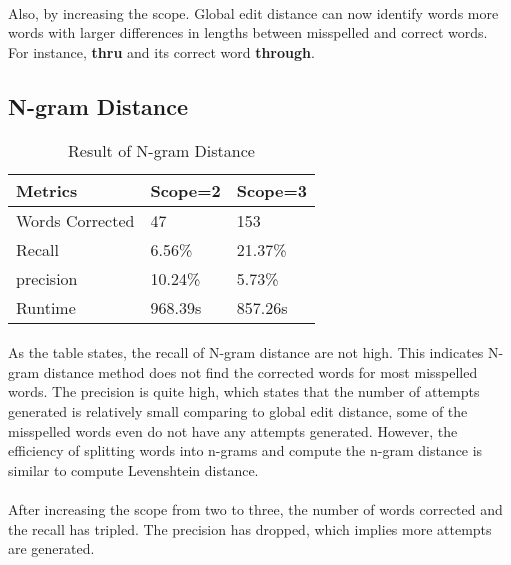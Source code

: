 \documentclass[11pt]{article}
\begin{document}
      \paragraph{}
      Also, by increasing the scope. Global edit distance can now identify words more words
      with larger differences in lengths between misspelled and correct words.
      For instance, \textbf{thru} and its correct word \textbf{through}.

  \subsection{N-gram Distance}
    \begin{table}[h]
      \begin{center}
        \begin{tabular}{|l|l|l|}
          \hline
          Metrics & Scope=2 & Scope=3\\
          \hline\hline
          Words Corrected & 47 & 153\\
          \hline
          Recall & 6.56\% & 21.37\%\\
          \hline
          precision & 10.24\% & 5.73\%\\
          \hline
          Runtime & 968.39s & 857.26s\\
          \hline
        \end{tabular}
        \caption{Result of N-gram Distance}\label{table3}
      \end{center}
    \end{table}

    \paragraph{}
    As the table states, the recall of N-gram distance are not high.
    This indicates N-gram distance method does not find the corrected words for
    most misspelled words. The precision is quite high, which states that the number
    of attempts generated is relatively small comparing to global edit distance, some
    of the misspelled words even do not have any attempts generated.
    However, the efficiency of splitting words into n-grams and compute the
    n-gram distance is similar to compute Levenshtein distance.
    \paragraph{}
    After increasing the scope from two to three, the number of words corrected
    and the recall has tripled. The precision has dropped, which implies more
    attempts are generated.
\end{document}
